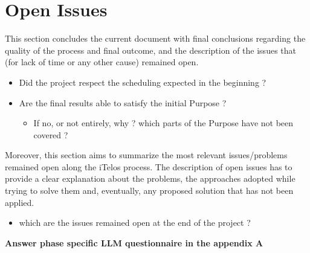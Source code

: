 \section{Open Issues}

This section concludes the current document with final conclusions regarding the quality of the process and final outcome, and the description of the issues that (for lack of time or any other cause) remained open.\\

\begin{itemize}
    \item Did the project respect the scheduling expected in the beginning ?
    \item Are the final results able to satisfy the initial Purpose ?
        \begin{itemize}
            \item If no, or not entirely, why ? which parts of the Purpose have not been covered ?
        \end{itemize}
\end{itemize}


\noindent Moreover, this section aims to summarize the most relevant issues/problems remained open along the iTelos process. The description of open issues has to provide a clear explanation about the problems, the approaches adopted while trying to solve them and, eventually, any proposed solution that has not been applied.\\

\begin{itemize}
    \item which are the issues remained open at the end of the project ?
\end{itemize}

\noident \textbf{Answer phase specific LLM questionnaire in the appendix A}